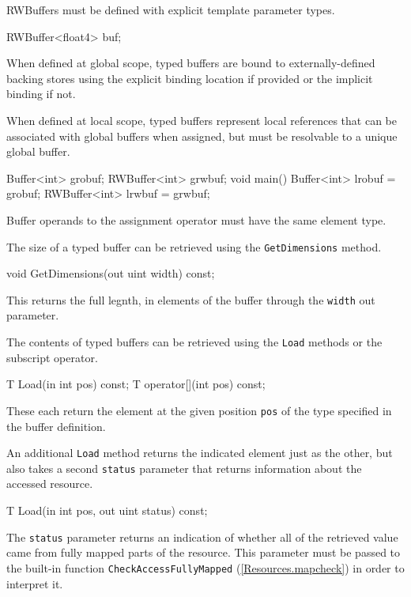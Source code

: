 RWBuffers must be defined with explicit template parameter types.
\begin{HLSL}
  RWBuffer<float4> buf;
\end{HLSL}

When defined at global scope, typed buffers are bound to externally-defined backing stores
using the explicit binding location if provided or the implicit binding if not.

When defined at local scope, typed buffers represent local references
that can be associated with global buffers when assigned,
but must be resolvable to a unique global buffer.

\begin{HLSL}
  Buffer<int> grobuf;
  RWBuffer<int> grwbuf;
  void main() {
    Buffer<int> lrobuf = grobuf;
    RWBuffer<int> lrwbuf = grwbuf;
  }
\end{HLSL}
Buffer operands to the assignment operator must have the same element type.


The size of a typed buffer can be retrieved using the \texttt{GetDimensions} method.
\begin{HLSL}
void GetDimensions(out uint width) const;
\end{HLSL}

This returns the full legnth, in elements of the buffer through the \texttt{width} out parameter.


The contents of typed buffers can be retrieved using the \texttt{Load} methods
or the subscript operator.

\begin{HLSL}
 T Load(in int pos) const;
 T operator[](int pos) const;
\end{HLSL}

These each return the element at the given position \texttt{pos} of the type specified in the buffer definition.

An additional \texttt{Load} method returns the indicated element just as the other,
but also takes a second \texttt{status} parameter that returns information about the accessed resource.
\begin{HLSL}
 T Load(in int pos, out uint status) const;
\end{HLSL}

The \texttt{status} parameter returns an indication of whether all of the retrieved value
came from fully mapped parts of the resource.
This parameter must be passed to the built-in function \texttt{CheckAccessFullyMapped} (\ref{Resources.mapcheck})
in order to interpret it.

